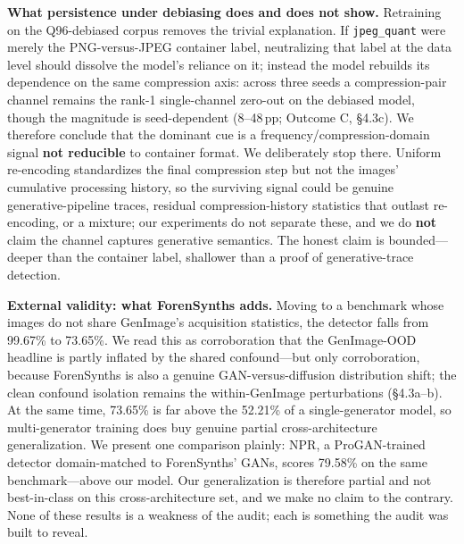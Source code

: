 \textbf{What persistence under debiasing does and does not show.} Retraining on the Q96-debiased corpus removes the trivial explanation. If \texttt{jpeg\_quant} were merely the PNG-versus-JPEG container label, neutralizing that label at the data level should dissolve the model's reliance on it; instead the model rebuilds its dependence on the same compression axis: across three seeds a compression-pair channel remains the rank-1 single-channel zero-out on the debiased model, though the magnitude is seed-dependent (8--48\,pp; Outcome C, \S{}4.3c). We therefore conclude that the dominant cue is a frequency/compression-domain signal \textbf{not reducible} to container format. We deliberately stop there. Uniform re-encoding standardizes the final compression step but not the images' cumulative processing history, so the surviving signal could be genuine generative-pipeline traces, residual compression-history statistics that outlast re-encoding, or a mixture; our experiments do not separate these, and we do \textbf{not} claim the channel captures generative semantics. The honest claim is bounded---deeper than the container label, shallower than a proof of generative-trace detection.

\textbf{External validity: what ForenSynths adds.} Moving to a benchmark whose images do not share GenImage's acquisition statistics, the detector falls from 99.67\% to 73.65\%. We read this as corroboration that the GenImage-OOD headline is partly inflated by the shared confound---but only corroboration, because ForenSynths is also a genuine GAN-versus-diffusion distribution shift; the clean confound isolation remains the within-GenImage perturbations (\S{}4.3a--b). At the same time, 73.65\% is far above the 52.21\% of a single-generator model, so multi-generator training does buy genuine partial cross-architecture generalization. We present one comparison plainly: NPR, a ProGAN-trained detector domain-matched to ForenSynths' GANs, scores 79.58\% on the same benchmark---above our model. Our generalization is therefore partial and not best-in-class on this cross-architecture set, and we make no claim to the contrary. None of these results is a weakness of the audit; each is something the audit was built to reveal.

